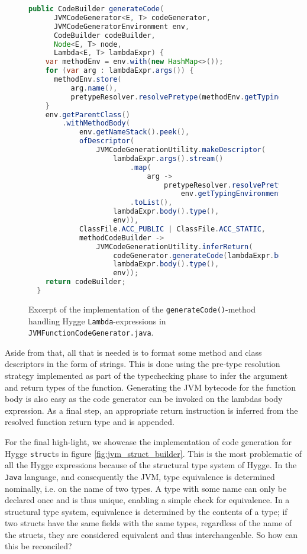 \begin{figure}[H]
 \centering 
 \begin{lstlisting}[language=Java]
  public CodeBuilder generateCode(
      JVMCodeGenerator<E, T> codeGenerator,
      JVMCodeGeneratorEnvironment env,
      CodeBuilder codeBuilder,
      Node<E, T> node,
      Lambda<E, T> lambdaExpr) {
    var methodEnv = env.with(new HashMap<>());
    for (var arg : lambdaExpr.args()) {
      methodEnv.store(
          arg.name(),
          pretypeResolver.resolvePretype(methodEnv.getTypingEnvironment(), arg.preType()));
    }
    env.getParentClass()
        .withMethodBody(
            env.getNameStack().peek(),
            ofDescriptor(
                JVMCodeGenerationUtility.makeDescriptor(
                    lambdaExpr.args().stream()
                        .map(
                            arg ->
                                pretypeResolver.resolvePretype(
                                    env.getTypingEnvironment(), arg.preType()))
                        .toList(),
                    lambdaExpr.body().type(),
                    env)),
            ClassFile.ACC_PUBLIC | ClassFile.ACC_STATIC,
            methodCodeBuilder ->
                JVMCodeGenerationUtility.inferReturn(
                    codeGenerator.generateCode(lambdaExpr.body(), methodEnv, methodCodeBuilder),
                    lambdaExpr.body().type(),
                    env));
    return codeBuilder;
  }
 \end{lstlisting}
 \caption{Excerpt of the implementation of the \texttt{generateCode()}-method handling Hygge \texttt{Lambda}-expressions in \texttt{JVMFunctionCodeGenerator.java}.}
 \label{fig:jvm_function_builder}
\end{figure}

Aside from that, all that is needed is to format some method and class descriptors in the form of strings. This is done using the pre-type resolution strategy
implemented as part of the typechecking phase to infer the argument and return types of the function. Generating the JVM bytecode for the function
body is also easy as the code generator can be invoked on the lambdas body expression. As a final step, an appropriate return instruction is inferred
from the resolved function return type and is appended.

For the final high-light, we showcase the implementation of code generation for Hygge \texttt{struct}s in figure \ref{fig:jvm_struct_builder}.
This is the most problematic of all the Hygge expressions because of the structural type system of Hygge. In the \texttt{Java} language, and consequently the JVM,
type equivalence is determined nominally, i.e. on the name of two types. A type with some name can only be declared once and is thus unique, enabling
a simple check for equivalence. In a structural type system, equivalence is determined by the contents of a type; if two structs have the same fields with
the same types, regardless of the name of the structs, they are considered equivalent and thus interchangeable\cite{pierce}. So how can this be reconciled?

